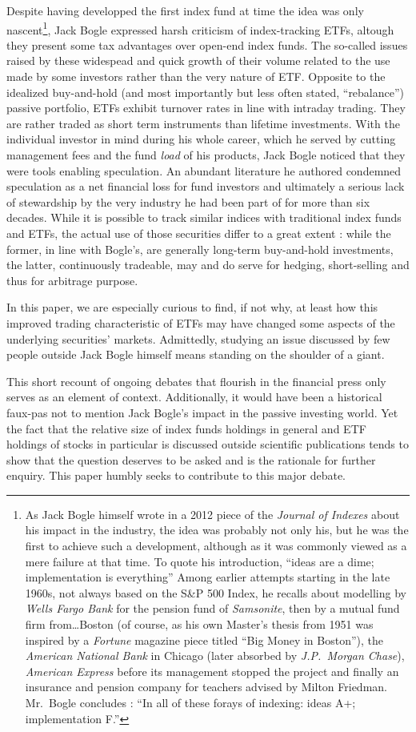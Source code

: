 Despite having developped the first index fund at time the idea was only nascent\footnote{As Jack Bogle himself wrote in a 2012 piece of the \textit{Journal of Indexes} about his impact in the industry, the idea was probably not only his, but he was the first to achieve such a development, although as it was commonly viewed as a mere failure at that time. To quote his introduction, ``ideas are a dime; implementation is everything'' Among earlier attempts starting in the late 1960s, not always based on the S\&P 500 Index, he recalls about modelling by \textit{Wells Fargo Bank} for the pension fund of \textit{Samsonite}, then by a mutual fund firm from\dots Boston (of course, as his own Master's thesis from 1951 was inspired by a \textit{Fortune} magazine piece titled ``Big Money in Boston''), the \textit{American National Bank} in Chicago (later absorbed by \textit{J.P.~Morgan Chase}), \textit{American Express} before its management stopped the project and finally an insurance and pension company for teachers advised by Milton Friedman. Mr.~Bogle concludes : ``In all of these forays of indexing: ideas A+; implementation F.''}, Jack Bogle expressed harsh criticism of index-tracking ETFs, altough they present some tax advantages over open-end index funds. The so-called issues raised by these widespead and quick growth of their volume related to the use made by some investors rather than the very nature of ETF. Opposite to the idealized buy-and-hold (and most importantly but less often stated, ``rebalance'') passive portfolio, ETFs exhibit turnover rates in line with intraday trading. They are rather traded as short term instruments than lifetime investments. With the individual investor in mind during his whole career, which he served by cutting management fees and the fund \textit{load} of his products, Jack Bogle noticed that they were tools enabling speculation. An abundant literature he authored condemned speculation as a net financial loss for fund investors and ultimately a serious lack of stewardship by the very industry he had been part of for more than six decades. While it is possible to track similar indices with traditional index funds and ETFs, the actual use of those securities differ to a great extent : while the former, in line with Bogle's, are generally long-term buy-and-hold investments, the latter, continuously tradeable, may and do serve for hedging, short-selling and thus for arbitrage purpose.

In this paper, we are especially curious to find, if not why, at least how this improved trading characteristic of ETFs may have changed some aspects of the underlying securities' markets. Admittedly, studying an issue discussed by few people outside Jack Bogle himself means standing on the shoulder of a giant.

This short recount of ongoing debates that flourish in the financial press only serves as an element of context. Additionally, it would have been a historical faux-pas not to mention Jack Bogle's impact in the passive investing world. Yet the fact that the relative size of index funds holdings in general and ETF holdings of stocks in particular is discussed outside scientific publications tends to show that the question deserves to be asked and is the rationale for further enquiry. This paper humbly seeks to contribute to this major debate. 
